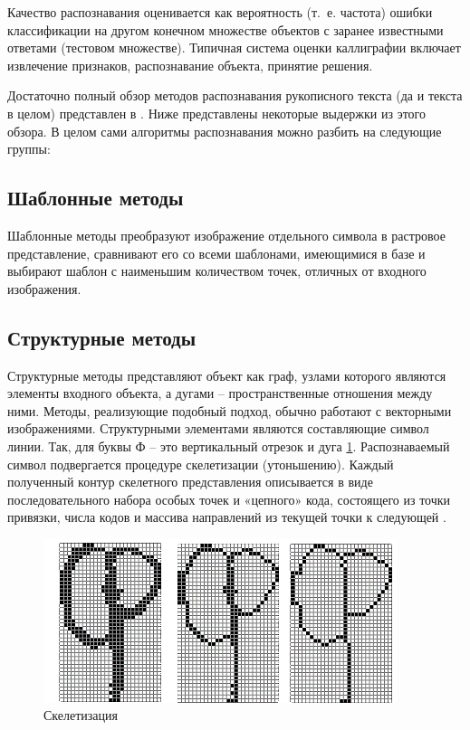 Качество распознавания оценивается как вероятность (т.~е. частота) ошибки
классификации на другом конечном множестве объектов с заранее известными
ответами (тестовом множестве). Типичная система оценки каллиграфии включает извлечение признаков, распознавание объекта, принятие решения.

Достаточно полный обзор методов распознавания рукописного текста (да и текста в целом) представлен в \cite{demin}. Ниже представлены некоторые выдержки из этого обзора.
В целом сами алгоритмы распознавания можно разбить на следующие группы:

\subsection{Шаблонные методы}

Шаблонные методы преобразуют изображение отдельного символа в растровое
представление, сравнивают его со всеми шаблонами, имеющимися в базе и выбирают
шаблон с наименьшим количеством точек, отличных от входного изображения.

\subsection{Структурные методы}

Структурные методы \cite{fuk, gorlov} представляют объект как граф, узлами которого
являются элементы входного объекта, а дугами -- пространственные отношения между
ними. Методы, реализующие подобный подход, обычно работают с векторными
изображениями. Структурными элементами являются составляющие символ линии.
Так, для буквы Ф -- это вертикальный отрезок и дуга \ref{img_skelet}. Распознаваемый символ
подвергается процедуре скелетизации (утоньшению). Каждый полученный
контур скелетного представления описывается в виде последовательного набора
особых точек и «цепного» кода, состоящего из точки привязки, числа кодов и массива
направлений из текущей точки к следующей \cite{ocrai}.

\begin{figure}[h]
\centering
\includegraphics[width=0.75\linewidth,keepaspectratio]{images/intro_skelet_1}
\caption{Скелетизация}
\label{img_skelet}
\end{figure}


